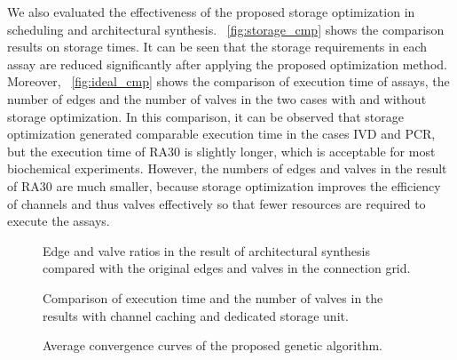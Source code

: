 
We also evaluated the effectiveness of the proposed storage optimization in scheduling
and architectural synthesis. \figname~\ref{fig:storage_cmp} shows the comparison results on storage times. It can be seen that the storage requirements in each assay are reduced significantly after applying the proposed optimization method.  Moreover, \figname~\ref{fig:ideal_cmp} shows the comparison of execution time of assays,
the number of edges and the number of valves in the two cases with and without
storage optimization.
In this comparison, it can be observed that storage optimization
generated comparable execution time in the cases IVD and PCR, but the execution
time of RA30 is slightly longer, which is acceptable for most biochemical
experiments. However, the numbers of edges and valves in the result
of RA30 are much smaller, because storage optimization
improves the efficiency of channels and thus valves effectively so that fewer
resources are required to execute the assays.

\begin{figure}[t]
{\figurefontsize
\centering
\vskip 5pt

%
\caption{
Edge and valve ratios in the result of
architectural synthesis compared with the original edges and valves
in the connection grid.}
\label{fig:edge_valve_percentage}
}
\end{figure}

\begin{figure}[t]
{\figurefontsize
\centering

%
\caption{Comparison of execution time and the number of valves
in the results with channel caching and dedicated storage unit.}
\label{fig:exe_time_valve_cmp}
}
\end{figure}

\begin{figure}[t]
{
  \figurefontsize
\centering

%
\caption{Average convergence curves of the proposed genetic algorithm.}
\label{fig:iteration}
}
\end{figure}

